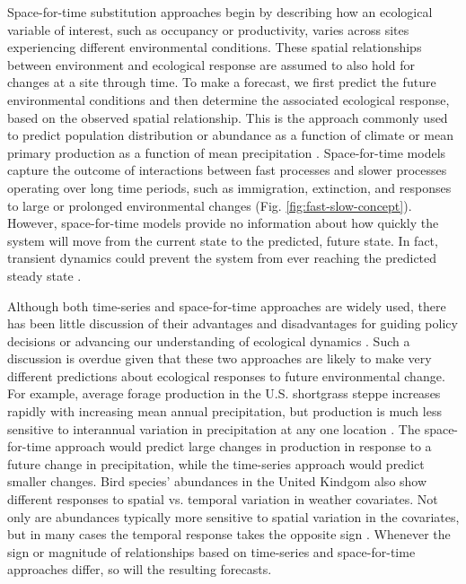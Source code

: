 \documentclass[11pt]{article}
\begin{document}
Space-for-time substitution approaches begin by describing how an ecological variable of interest, such as occupancy or productivity,  varies across sites experiencing different environmental conditions. These spatial relationships between environment and ecological response are assumed to also hold for changes at a site through time. To make a forecast, we first predict the future environmental conditions and then determine the associated ecological response, based on the observed spatial relationship.  This is the approach commonly used to predict population distribution or abundance as a function of climate \citep{elith_species_2009} or mean primary production as a function of mean precipitation \citep{Sala1988}. Space-for-time models capture the outcome of interactions between fast processes and slower processes operating over long time periods, such as immigration, extinction, and responses to large or prolonged environmental changes (Fig. \ref{fig:fast-slow-concept}). However, space-for-time models provide no information about how quickly the system will move from the current state to the predicted, future state. In fact, transient dynamics could prevent the system from ever reaching the predicted steady state \citep{Urban2012}. 

Although both time-series and space-for-time approaches are widely used, there has been little discussion of their advantages and disadvantages for guiding policy decisions or advancing our understanding of ecological dynamics \citep{harris_forecasting_2018,Renwick2018}. Such a discussion is overdue given that these two approaches are likely to make very different predictions about ecological responses to future environmental change. For example, average forage production in the U.S. shortgrass steppe increases rapidly with increasing mean annual precipitation, but production is much less sensitive to interannual variation in precipitation at any one location \citep{lauenroth_long-term_1992}. The space-for-time approach would predict large changes in production in response to a future change in precipitation, while the time-series approach would predict smaller changes. Bird species' abundances in the United Kindgom also show different responses to spatial vs. temporal variation in weather covariates. Not only are abundances typically more sensitive to spatial variation in the covariates, but in many cases the temporal response takes the opposite sign \citep{Oedekoven2017}. Whenever the sign or magnitude of relationships based on time-series and space-for-time approaches differ, so will the resulting forecasts.
\end{document}

